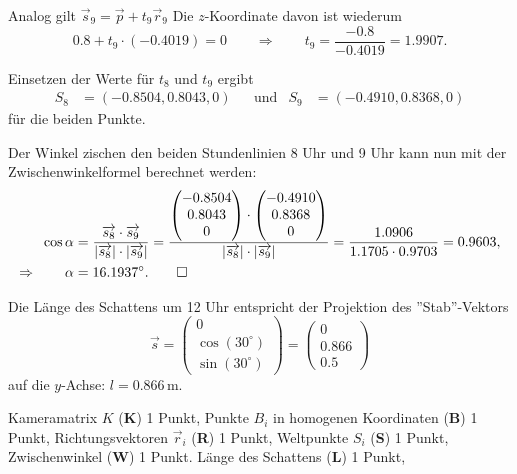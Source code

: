 \begin{loesung}
\begin{teilaufgaben}
Analog gilt $\vec s_9 = \vec {p} + t_9\vec{r}_9$
Die $z$-Koordinate davon ist wiederum
\[
0.8 + t_9\cdot (-0.4019) = 0
\qquad\Rightarrow\qquad
t_9 = \frac{-0.8}{-0.4019}=1.9907.\]

Einsetzen der Werte für $t_8$ und $t_9$ ergibt
\[
\begin{aligned}
S_8&=(-0.8504, 0.8043, 0)
&&\text{und}&
S_9&=(-0.4910, 0.8368, 0)
\end{aligned}
\]
für die beiden Punkte. 

Der Winkel zischen den beiden Stundenlinien 8 Uhr und 9 Uhr kann 
nun mit der Zwischenwinkelformel berechnet werden:
\begin{align*}
\cos\alpha
&=
\frac{\overrightarrow{s_8}\cdot\overrightarrow{s_9}}{|\overrightarrow{s_8}|\cdot|\overrightarrow{s_9}|}
=
\frac{\begin{pmatrix}-0.8504\\ 0.8043\\ 0\end{pmatrix}
\cdot\begin{pmatrix}-0.4910\\ 0.8368\\ 0\end{pmatrix}}
{|\overrightarrow{s_8}|\cdot|\overrightarrow{s_9}|}
=
\frac{1.0906}{1.1705\cdot 0.9703} = 0.9603,
\\
\Rightarrow\qquad
\alpha
&=
16.1937^\circ.
\qedhere
\end{align*}
\item
Die Länge des Schattens um 12 Uhr entspricht der Projektion des ''Stab''-Vektors
\[
  \vec s = \begin{pmatrix} 0\\ \cos(30^\circ) \\ \sin(30^\circ) \end{pmatrix}
  = \begin{pmatrix} 0\\ 0.866 \\ 0.5 \end{pmatrix}
\]
auf die $y$-Achse: $l = 0.866\,$m.
\end{teilaufgaben}
\end{loesung}

\begin{bewertung}
Kameramatrix $K$ ({\bf K}) 1 Punkt,
Punkte $B_i$ in homogenen Koordinaten ({\bf B}) 1 Punkt,
Richtungsvektoren $\vec{r}_i$ ({\bf R}) 1 Punkt,
Weltpunkte $S_i$ ({\bf S}) 1 Punkt,
Zwischenwinkel ({\bf W}) 1 Punkt.
Länge des Schattens ({\bf L}) 1 Punkt,
\end{bewertung}
